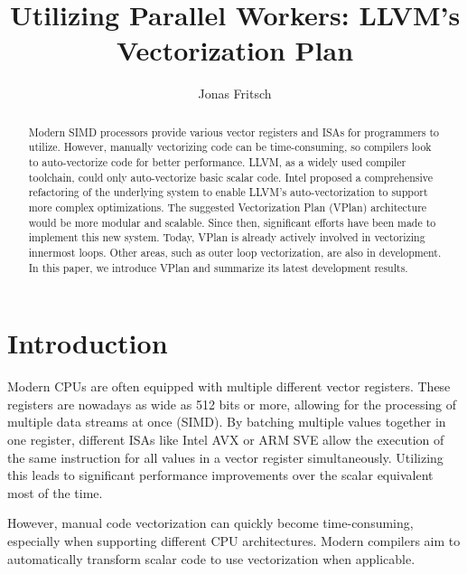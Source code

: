 \documentclass[sigplan,11pt,nonacm]{acmart}
\begin{document}
\title[State of LLVM's Vectorization Plan]{Utilizing Parallel Workers: LLVM's Vectorization Plan}
\author{Jonas Fritsch}

\begin{abstract}
  Modern SIMD processors provide various vector registers and ISAs for programmers to utilize. 
  However, manually vectorizing code can be time-consuming, so compilers look to auto-vectorize 
  code for better performance. LLVM, as a widely used compiler toolchain, could only auto-vectorize 
  basic scalar code. Intel proposed a comprehensive refactoring of the underlying system to enable 
  LLVM's auto-vectorization to support more complex optimizations. The suggested Vectorization Plan 
  (VPlan) architecture would be more modular and scalable. Since then, significant efforts have been 
  made to implement this new system. Today, VPlan is already actively involved in vectorizing 
  innermost loops. Other areas, such as outer loop vectorization, are also in development.
  In this paper, we introduce VPlan and summarize its latest development results.
\end{abstract}

\maketitle



\section{Introduction}
\label{sec:introduction}
Modern CPUs are often equipped with multiple different vector registers. These registers are nowadays 
as wide as 512 bits or more, allowing for the processing of multiple data streams at once (SIMD). By 
batching multiple values together in one register, different ISAs like Intel AVX or ARM SVE allow 
the execution of the same instruction for all values in a vector register simultaneously. 
Utilizing this leads to significant performance improvements over the scalar equivalent most of 
the time.

However, manual code vectorization can quickly become time-consuming, especially when
supporting different CPU architectures. Modern compilers aim to automatically transform scalar code
to use vectorization when applicable.
\end{document}
